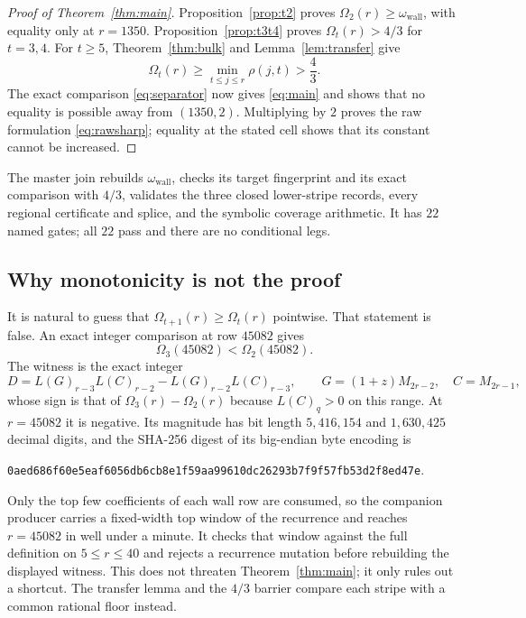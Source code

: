 \documentclass[11pt,a4paper]{article}
\theoremstyle{plain}
\theoremstyle{remark}
\newcommand{\Omw}{\omega_{\mathrm{wall}}}
\begin{document}
\begin{proof}[Proof of Theorem~\ref{thm:main}]
Proposition~\ref{prop:t2} proves
$\Omega_2(r)\ge\Omw$, with equality only at $r=1350$.
Proposition~\ref{prop:t3t4} proves $\Omega_t(r)>4/3$ for $t=3,4$.
For $t\ge5$, Theorem~\ref{thm:bulk} and Lemma~\ref{lem:transfer} give
\[
 \Omega_t(r)\ge\min_{t\le j\le r}\rho(j,t)>\frac43.
\]
The exact comparison \eqref{eq:separator} now gives \eqref{eq:main} and shows
that no equality is possible away from $(1350,2)$.  Multiplying by $2$ proves
the raw formulation \eqref{eq:rawsharp}; equality at the stated cell shows
that its constant cannot be increased.
\end{proof}

The master join rebuilds $\Omw$, checks its target fingerprint and its exact
comparison with $4/3$, validates the three closed lower-stripe records, every
regional certificate and splice, and the symbolic coverage arithmetic.  It
has $22$ named gates; all $22$ pass and there are no conditional legs.

\subsection{Why monotonicity is not the proof}

It is natural to guess that $\Omega_{t+1}(r)\ge\Omega_t(r)$ pointwise.  That
statement is false.  An exact integer comparison at row $45082$ gives
\begin{equation}\label{eq:monotonicityfail}
 \Omega_3(45082)<\Omega_2(45082).
\end{equation}
The witness is the exact integer
\[
 D=L(G)_{r-3}L(C)_{r-2}-L(G)_{r-2}L(C)_{r-3},
 \qquad
 G=(1+z)M_{2r-2},\quad C=M_{2r-1},
\]
whose sign is that of $\Omega_3(r)-\Omega_2(r)$ because $L(C)_q>0$ on this
range.  At $r=45082$ it is negative.  Its magnitude has bit length
$5{,}416{,}154$ and $1{,}630{,}425$ decimal digits, and the SHA-256 digest of
its big-endian byte encoding is
\begin{center}
\texttt{0aed686f60e5eaf6056db6cb8e1f59aa99610dc26293b7f9f57fb53d2f8ed47e}.
\end{center}
Only the top few coefficients of each wall row are consumed, so the companion
producer carries a fixed-width top window of the recurrence and reaches
$r=45082$ in well under a minute.  It checks that window against the full
definition on $5\le r\le40$ and rejects a recurrence mutation before
rebuilding the displayed witness.
This does not threaten Theorem~\ref{thm:main}; it only rules out a shortcut.
The transfer lemma and the $4/3$ barrier compare each stripe with a common
rational floor instead.
\end{document}
